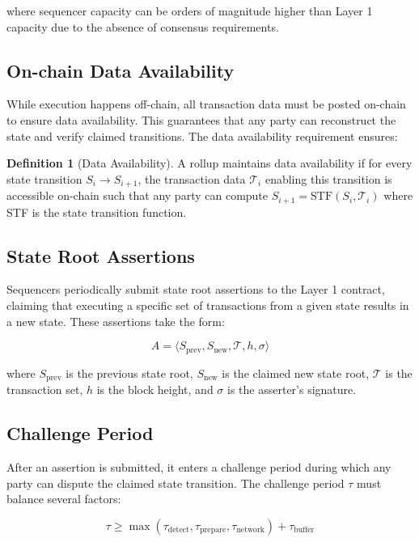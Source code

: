 \documentclass[11pt,a4paper]{article}
\theoremstyle{definition}
\newtheorem{definition}{Definition}[section]
\begin{document}
where sequencer capacity can be orders of magnitude higher than Layer 1 capacity due to the absence of consensus requirements.

\subsection{On-chain Data Availability}

While execution happens off-chain, all transaction data must be posted on-chain to ensure data availability. This guarantees that any party can reconstruct the state and verify claimed transitions. The data availability requirement ensures:

\begin{definition}[Data Availability]
A rollup maintains data availability if for every state transition $S_i \rightarrow S_{i+1}$, the transaction data $\mathcal{T}_i$ enabling this transition is accessible on-chain such that any party can compute $S_{i+1} = \text{STF}(S_i, \mathcal{T}_i)$ where STF is the state transition function.
\end{definition}

\subsection{State Root Assertions}

Sequencers periodically submit state root assertions to the Layer 1 contract, claiming that executing a specific set of transactions from a given state results in a new state. These assertions take the form:

\begin{equation}
A = \langle S_{\text{prev}}, S_{\text{new}}, \mathcal{T}, h, \sigma \rangle
\end{equation}

where $S_{\text{prev}}$ is the previous state root, $S_{\text{new}}$ is the claimed new state root, $\mathcal{T}$ is the transaction set, $h$ is the block height, and $\sigma$ is the asserter's signature.

\subsection{Challenge Period}

After an assertion is submitted, it enters a challenge period during which any party can dispute the claimed state transition. The challenge period $\tau$ must balance several factors:

\begin{equation}
\tau \geq \max(\tau_{\text{detect}}, \tau_{\text{prepare}}, \tau_{\text{network}}) + \tau_{\text{buffer}}
\end{equation}
\end{document}
